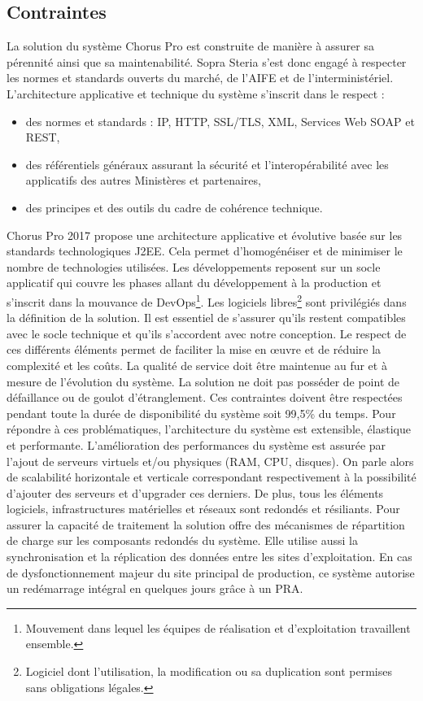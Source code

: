 \documentclass[12pt,a4paper]{article}
\begin{document}
\subsection{Contraintes}
La solution du système Chorus Pro est construite de manière à assurer sa pérennité ainsi que sa maintenabilité. Sopra Steria s'est donc engagé à respecter les normes et standards ouverts du marché, de l'AIFE et de l'interministériel. L’architecture applicative et technique du système s’inscrit dans le respect :
\smallbreak
\begin{itemize}
\item	des normes et standards : IP, HTTP, SSL/TLS, XML, Services Web \gls{SOAP} et \gls{REST},
\item	des référentiels généraux assurant la sécurité et l’interopérabilité avec les applicatifs des autres Ministères et partenaires,
\item	des principes et des outils du cadre de cohérence technique.
\end{itemize}
\medbreak
Chorus Pro 2017 propose une architecture applicative et évolutive basée sur les standards technologiques \gls{J2EE}. Cela permet d'homogénéiser et de minimiser le nombre de technologies utilisées. Les développements reposent sur un socle applicatif qui couvre les phases allant du développement à la production et s’inscrit dans la mouvance de DevOps\footnote{Mouvement dans lequel les équipes de réalisation et d'exploitation travaillent ensemble.}. Les logiciels libres\footnote{Logiciel dont l'utilisation, la modification ou sa duplication sont permises sans obligations légales.} sont privilégiés dans la définition de la solution. Il est essentiel de s'assurer qu’ils restent compatibles avec le socle technique et qu'ils s'accordent avec notre conception. Le respect de ces différents éléments permet de faciliter la mise en œuvre et de réduire la complexité et les coûts.
\smallbreak
La qualité de service doit être maintenue au fur et à mesure de l’évolution du système. La solution ne doit pas posséder de point de défaillance ou de goulot d'étranglement. Ces contraintes doivent être respectées pendant toute la durée de disponibilité du système soit 99,5\% du temps. Pour répondre à ces problématiques, l'architecture du système est extensible, élastique et performante. L'amélioration des performances du système est assurée par l'ajout de serveurs virtuels et/ou physiques (\gls{RAM}, \gls{CPU}, disques). On parle alors de scalabilité horizontale et verticale correspondant respectivement à la possibilité d'ajouter des serveurs et d'upgrader ces derniers.
\smallbreak
De plus, tous les éléments logiciels, infrastructures matérielles et réseaux sont redondés et résiliants. Pour assurer la capacité de traitement la solution offre des mécanismes de répartition de charge sur les composants redondés du système. Elle utilise aussi la synchronisation et la réplication des données entre les sites d’exploitation. En cas de dysfonctionnement majeur du site principal de production, ce système autorise un redémarrage intégral en quelques jours grâce à un \gls{PRA}.  
\end{document}
